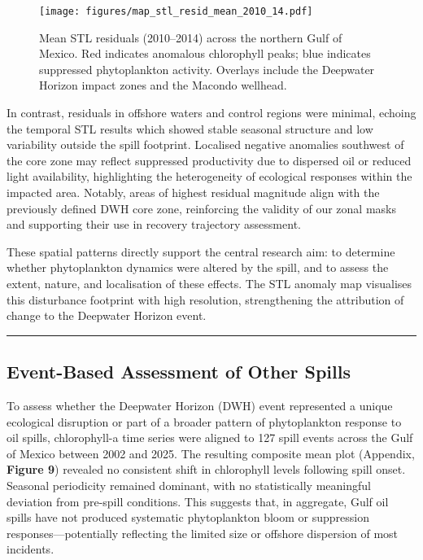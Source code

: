 \documentclass[
  11pt,
]{article}
\begin{document}
\begin{figure}[H]

{\centering \texttt{[image: figures/map\_stl\_resid\_mean\_2010\_14.pdf]}

}

\caption{Mean STL residuals (2010--2014) across the northern Gulf of
Mexico. Red indicates anomalous chlorophyll peaks; blue indicates
suppressed phytoplankton activity. Overlays include the Deepwater
Horizon impact zones and the Macondo wellhead.}

\end{figure}%

In contrast, residuals in offshore waters and control regions were
minimal, echoing the temporal STL results which showed stable seasonal
structure and low variability outside the spill footprint. Localised
negative anomalies southwest of the core zone may reflect suppressed
productivity due to dispersed oil or reduced light availability,
highlighting the heterogeneity of ecological responses within the
impacted area. Notably, areas of highest residual magnitude align with
the previously defined DWH core zone, reinforcing the validity of our
zonal masks and supporting their use in recovery trajectory assessment.

These spatial patterns directly support the central research aim: to
determine whether phytoplankton dynamics were altered by the spill, and
to assess the extent, nature, and localisation of these effects. The STL
anomaly map visualises this disturbance footprint with high resolution,
strengthening the attribution of change to the Deepwater Horizon event.

\begin{center}\rule{0.5\linewidth}{0.5pt}\end{center}

\subsection{Event-Based Assessment of Other
Spills}\label{event-based-assessment-of-other-spills}

To assess whether the Deepwater Horizon (DWH) event represented a unique
ecological disruption or part of a broader pattern of phytoplankton
response to oil spills, chlorophyll-a time series were aligned to 127
spill events across the Gulf of Mexico between 2002 and 2025. The
resulting composite mean plot (Appendix, \textbf{Figure 9}) revealed no
consistent shift in chlorophyll levels following spill onset. Seasonal
periodicity remained dominant, with no statistically meaningful
deviation from pre-spill conditions. This suggests that, in aggregate,
Gulf oil spills have not produced systematic phytoplankton bloom or
suppression responses---potentially reflecting the limited size or
offshore dispersion of most incidents.
\end{document}
